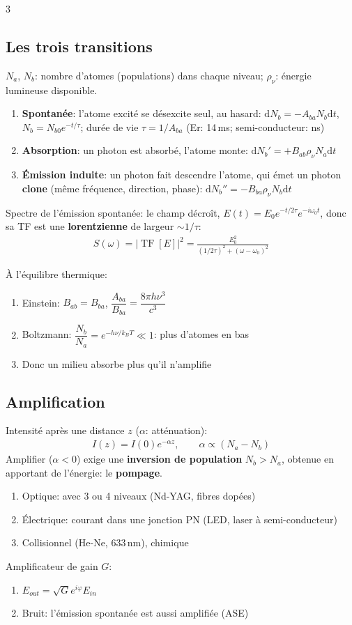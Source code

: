 \documentclass[12pt, a4paper]{article}
\newcommand{\TF}{\operatorname{TF}}
\newcommand{\dd}{\mathrm{d}}
\begin{document}
\begin{multicols*}{3}
	\subsection{Les trois transitions}
	$N_a$, $N_b$: nombre d'atomes (populations) dans chaque niveau; $\rho_\nu$: énergie lumineuse disponible.
	\begin{enumerate}[\roman*.]
		\item \textbf{Spontanée}: l'atome excité se désexcite seul, au hasard: $\dd N_b=-A_{ba}N_b\dd t$, $N_b=N_{b0}e^{-t/\tau}$; durée de vie $\tau=1/A_{ba}$ (Er: 14\,ms; semi-conducteur: ns)
		\item \textbf{Absorption}: un photon est absorbé, l'atome monte: $\dd N_b'=+B_{ab}\rho_\nu N_a\dd t$
		\item \textbf{Émission induite}: un photon fait descendre l'atome, qui émet un photon \textbf{clone} (même fréquence, direction, phase): $\dd N_b''=-B_{ba}\rho_\nu N_b\dd t$
	\end{enumerate}
	Spectre de l'émission spontanée: le champ décroît, $E(t)=E_0e^{-t/2\tau}e^{-i\omega_0t}$, donc sa TF est une \textbf{lorentzienne} de largeur $\sim1/\tau$:
	\begin{gather*}
		S(\omega)=|\TF[E]|^2=\frac{E_0^2}{(1/2\tau)^2+(\omega-\omega_0)^2}
	\end{gather*}

	\colbreak
	À l'équilibre thermique:
	\begin{enumerate}[\roman*.]
		\item Einstein: $B_{ab}=B_{ba}$, $\dfrac{A_{ba}}{B_{ba}}=\dfrac{8\pi h\nu^3}{c^3}$
		\item Boltzmann: $\dfrac{N_b}{N_a}=e^{-h\nu/k_BT}\ll1$: plus d'atomes en bas
		\item Donc un milieu absorbe plus qu'il n'amplifie
	\end{enumerate}

	\subsection{Amplification}
	Intensité après une distance $z$ ($\alpha$: atténuation):
	\begin{gather*}
		I(z)=I(0)e^{-\alpha z},\qquad\alpha\propto(N_a-N_b)
	\end{gather*}
	Amplifier ($\alpha<0$) exige une \textbf{inversion de population} $N_b>N_a$, obtenue en apportant de l'énergie: le \textbf{pompage}.
	\begin{enumerate}[\roman*.]
		\item Optique: avec 3 ou 4 niveaux (Nd-YAG, fibres dopées)
		\item Électrique: courant dans une jonction PN (LED, laser à semi-conducteur)
		\item Collisionnel (He-Ne, 633\,nm), chimique
	\end{enumerate}
	Amplificateur de gain $G$:
	\begin{enumerate}[\roman*.]
		\item $E_{out}=\sqrt Ge^{i\varphi}E_{in}$
		\item Bruit: l'émission spontanée est aussi amplifiée (ASE)
	\end{enumerate}


\end{multicols*}
\end{document}
